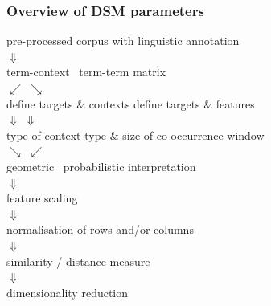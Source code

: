 \documentclass[t]{beamer} %
\begin{document}
\begin{frame}
  \frametitle{Overview of DSM parameters}

  \ungap[2]
  \begin{center}
    pre-processed corpus with linguistic annotation\\
    \pause $\Downarrow$\\
    term-context \vs\ term-term matrix\\
    \pause $\swarrow$ \hspace{3cm} $\searrow$\\
    define targets \& contexts \hspace{2cm} define targets \& features\\
    \pause $\Downarrow$ \hspace{6cm} $\Downarrow$ \\
    type of context \hspace{2cm} type \& size of co-occurrence window\\
    \pause $\searrow$ \hspace{3cm} $\swarrow$\\
    geometric \vs\ probabilistic interpretation\\
    \pause $\Downarrow$\\
    feature scaling\\
    \pause $\Downarrow$\\
    normalisation of rows and/or columns\\
    \pause $\Downarrow$\\
    similarity / distance measure\\
    \pause $\Downarrow$\\
    dimensionality reduction
  \end{center}
\end{frame}
\end{document}
